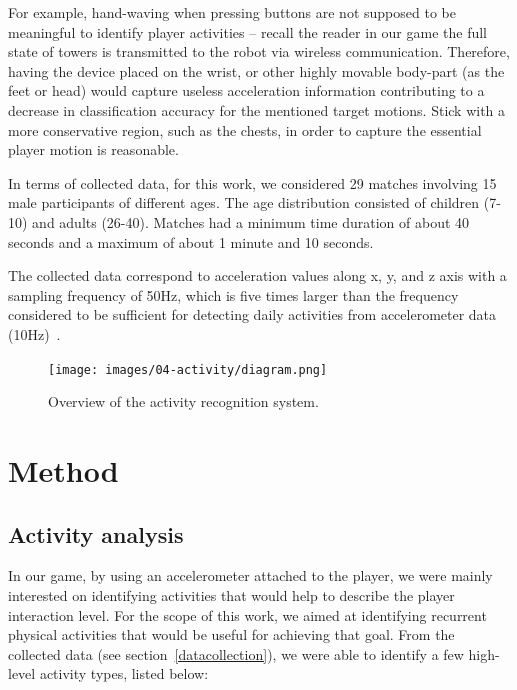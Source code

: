 For example, hand-waving when pressing buttons are not supposed to be meaningful to identify player activities -- recall the reader in our game the full state of towers is transmitted to the robot via wireless communication. Therefore, having the device placed on the wrist, or other highly movable body-part (as the feet or head) would capture useless acceleration information contributing to a decrease in classification accuracy for the mentioned target motions. Stick with a more conservative region, such as the chests, in order to capture the essential player motion is reasonable.

In terms of collected data, for this work, we considered 29 matches involving 15 male participants of different ages. The age distribution consisted of children (7-10) and adults (26-40). Matches had a minimum time duration of about 40 seconds and a maximum of about 1 minute and 10 seconds. 

The collected data correspond to acceleration values along x, y, and z axis with a sampling frequency of 50Hz, which is five times larger than the frequency considered to be sufficient for detecting daily activities from accelerometer data (10Hz)~\cite{atallah_sensor_2010, ravi_activity_2005, kikhia_analyzing_2014}.

\begin{figure}[!t]
\normalsize
      \centering
      {\texttt{[image: images/04-activity/diagram.png]}}
      \caption{Overview of the activity recognition system.}
      \label{approach}
\end{figure}
  
\section{Method}
\subsection{Activity analysis}\label{activityanalysis}

In our game, by using an accelerometer attached to the player, we were mainly interested on identifying activities that would help to describe the player interaction level. For the scope of this work, we aimed at identifying recurrent physical activities that would be useful for achieving that goal. From the collected data (see section~\ref{datacollection}), we were able to identify a few high-level activity types, listed below:

